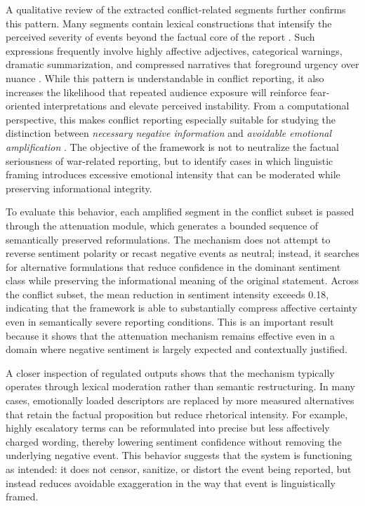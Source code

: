 \documentclass[final,1p,times]{elsarticle}
\begin{document}
A qualitative review of the extracted conflict-related segments further confirms this pattern. Many segments contain lexical constructions that intensify the perceived severity of events beyond the factual core of the report \cite{sacyaten2025crisis}. Such expressions frequently involve highly affective adjectives, categorical warnings, dramatic summarization, and compressed narratives that foreground urgency over nuance \cite{coombs2024emotions}. While this pattern is understandable in conflict reporting, it also increases the likelihood that repeated audience exposure will reinforce fear-oriented interpretations and elevate perceived instability. From a computational perspective, this makes conflict reporting especially suitable for studying the distinction between \emph{necessary negative information} and \emph{avoidable emotional amplification} \cite{acquaful2024framing,schuck2023emotional}. The objective of the framework is not to neutralize the factual seriousness of war-related reporting, but to identify cases in which linguistic framing introduces excessive emotional intensity that can be moderated while preserving informational integrity.

To evaluate this behavior, each amplified segment in the conflict subset is passed through the attenuation module, which generates a bounded sequence of semantically preserved reformulations. The mechanism does not attempt to reverse sentiment polarity or recast negative events as neutral; instead, it searches for alternative formulations that reduce confidence in the dominant sentiment class while preserving the informational meaning of the original statement. Across the conflict subset, the mean reduction in sentiment intensity exceeds 0.18, indicating that the framework is able to substantially compress affective certainty even in semantically severe reporting conditions. This is an important result because it shows that the attenuation mechanism remains effective even in a domain where negative sentiment is largely expected and contextually justified.

A closer inspection of regulated outputs shows that the mechanism typically operates through lexical moderation rather than semantic restructuring. In many cases, emotionally loaded descriptors are replaced by more measured alternatives that retain the factual proposition but reduce rhetorical intensity. For example, highly escalatory terms can be reformulated into precise but less affectively charged wording, thereby lowering sentiment confidence without removing the underlying negative event. This behavior suggests that the system is functioning as intended: it does not censor, sanitize, or distort the event being reported, but instead reduces avoidable exaggeration in the way that event is linguistically framed.
\end{document}
